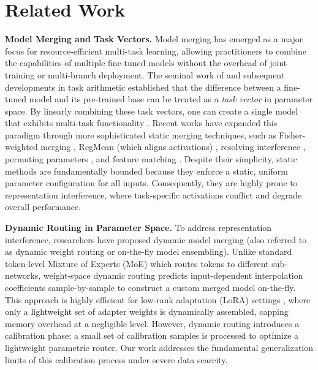 \section{Related Work}
\label{sec:related}

\textbf{Model Merging and Task Vectors.} Model merging has emerged as a major focus for resource-efficient multi-task learning, allowing practitioners to combine the capabilities of multiple fine-tuned models without the overhead of joint training or multi-branch deployment. The seminal work of \citet{mitchell80} and subsequent developments in task arithmetic \cite{langley00, ilharco22} established that the difference between a fine-tuned model and its pre-trained base can be treated as a \emph{task vector} in parameter space. By linearly combining these task vectors, one can create a single model that exhibits multi-task functionality \cite{wortsman22}. Recent works have expanded this paradigm through more sophisticated static merging techniques, such as Fisher-weighted merging \cite{matena21}, RegMean (which aligns activations) \cite{jin22}, resolving interference \cite{yadav23}, permuting parameters \cite{ainsworth2022git}, and feature matching \cite{stoica2023zipit}. Despite their simplicity, static methods are fundamentally bounded because they enforce a static, uniform parameter configuration for all inputs. Consequently, they are highly prone to representation interference, where task-specific activations conflict and degrade overall performance.

\textbf{Dynamic Routing in Parameter Space.} To address representation interference, researchers have proposed dynamic model merging (also referred to as dynamic weight routing or on-the-fly model ensembling). Unlike standard token-level Mixture of Experts (MoE) \cite{shazeer2017outrageously, fedus2021switch} which routes tokens to different sub-networks, weight-space dynamic routing predicts input-dependent interpolation coefficients sample-by-sample to construct a custom merged model on-the-fly. This approach is highly efficient for low-rank adaptation (LoRA) settings \cite{hu2021lora}, where only a lightweight set of adapter weights is dynamically assembled, capping memory overhead at a negligible level. However, dynamic routing introduces a calibration phase: a small set of calibration samples is processed to optimize a lightweight parametric router. Our work addresses the fundamental generalization limits of this calibration process under severe data scarcity.

